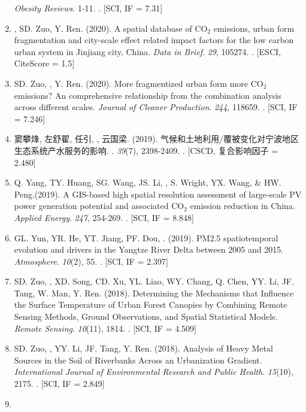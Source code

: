\begin{enumerate}
    \textit{Obesity Reviews}. 1-11.
    . [SCI, IF = 7.31]
\item
    \Shaoqing, SD. Zuo, Y. Ren. (2020).
    A spatial database of CO$_2$ emissions, urban form fragmentation and city-scale effect related impact factors for the low carbon urban system in Jinjiang city, China.
    \textit{Data in Brief}. \textit{29}, 105274.
    . [ESCI, CiteScore = 1.5]
\item
    SD. Zuo, \Shaoqing, Y. Ren. (2020).
    More fragmentized urban form more CO$_2$ emissions? An comprehensive relationship from the combination analysis across different scales.
    \textit{Journal of Cleaner Production}. \textit{244}, 118659.
    . [SCI, IF = 7.246]
\item
    窦攀烽, 左舒翟, 任引, {}, 云国梁. (2019).
    气候和土地利用/覆被变化对宁波地区生态系统产水服务的影响.
    {}. \textit{39}(7), 2398-2409.
    . [CSCD, 复合影响因子 = 2.480] 
\item
    Q. Yang, TY. Huang, SG. Wang, JS. Li, \Shaoqing, S. Wright, YX. Wang, \& HW. Peng.(2019).
    A GIS-based high spatial resolution assessment of large-scale PV power generation potential and associated CO$_2$ emission reduction in China.
    \textit{Applied Energy}. \textit{247}, 254-269.
    . [SCI, IF = 8.848]
\item
    GL. Yun, YR. He, YT. Jiang, PF. Dou, \Shaoqing. (2019).
    PM2.5 spatiotemporal evolution and drivers in the Yangtze River Delta between 2005 and 2015.
    \textit{Atmosphere}. \textit{10}(2), 55.
    . [SCI, IF = 2.397]
\item
    SD. Zuo, \Shaoqing, XD. Song, CD. Xu, YL. Liao, WY. Chang, Q. Chen, YY. Li, JF. Tang, W. Man, Y. Ren. (2018).
    Determining the Mechanisms that Influence the Surface Temperature of Urban Forest Canopies by Combining Remote Sensing Methods, Ground Observations, and Spatial Statistical Models. 
    \textit{Remote Sensing}. \textit{10}(11), 1814.
    . [SCI, IF = 4.509]
\item
    SD. Zuo, \Shaoqing, YY. Li, JF. Tang, Y. Ren. (2018).
	Analysis of Heavy Metal Sources in the Soil of Riverbanks Across an Urbanization Gradient.
    \textit{International Journal of Environmental Research and Public Health}. \textit{15}(10), 2175.
    . [SCI, IF = 2.849]
\item

\end{enumerate}
